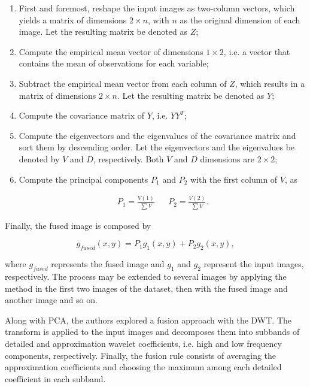 \begin{enumerate}[label=\Roman* -]
    \item First and foremost, reshape the input images as two-column vectors, which yields a matrix of dimensions $2 \times n$, with $n$ as the original dimension of each image. Let the resulting matrix be denoted as $Z$;
    
    \item Compute the empirical mean vector of dimensions $1 \times 2$, i.e. a vector that contains the mean of observations for each variable;
    
    \item Subtract the empirical mean vector from each column of $Z$, which results in a matrix of dimensions $2 \times n$. Let the resulting matrix be denoted as $Y$;
    
    \item Compute the covariance matrix of $Y$, i.e. $YY^{T}$;
    
    \item Compute the eigenvectors and the eigenvalues of the covariance matrix and sort them by descending order. Let the eigenvectors and the eigenvalues be denoted by $V$ and $D$, respectively. Both $V$ and $D$ dimensions are $2 \times 2$;
    
    \item Compute the principal components $P_{1}$ and $P_{2}$ with the first column of $V$, as
    
    \begin{align}
    P_{1} = \frac{V(1)}{\sum V}
    &&
    P_{2} = \frac{V(2)}{\sum V}.
    \end{align}
\end{enumerate}

\noindent Finally, the fused image is composed by

\begin{equation}
g_{fused}(x,y) = P_{1}g_{1}(x,y) + P_{2}g_{2}(x,y),
\end{equation}

\noindent where $g_{fused}$ represents the fused image and $g_{1}$ and $g_{2}$ represent the input images, respectively. The process may be extended to several images by applying the method in the first two images of the dataset, then with the fused image and another image and so on.

Along with PCA, the authors explored a fusion approach with the DWT. The transform is applied to the input images and decomposes them into subbands of detailed and approximation wavelet coefficients, i.e. high and low frequency components, respectively. Finally, the fusion rule consists of averaging the approximation coefficients and choosing the maximum among each detailed coefficient in each subband.

